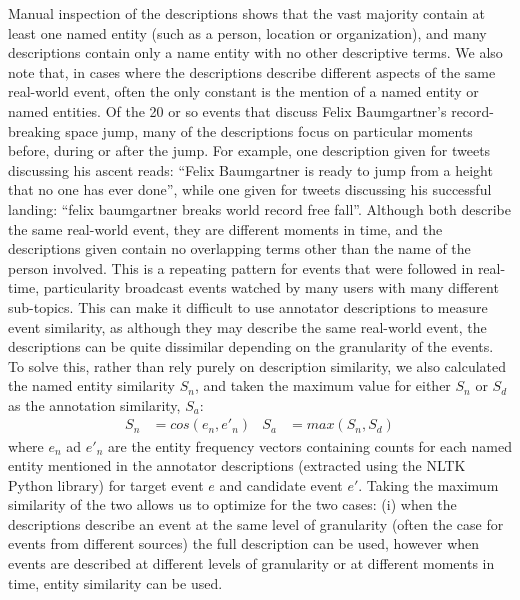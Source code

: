 Manual inspection of the descriptions shows that the vast majority contain at least one named entity (such as a person, location or organization), and many descriptions contain only a name entity with no other descriptive terms.
We also note that, in cases where the descriptions describe different aspects of the same real-world event, often the only constant is the mention of a named entity or named entities.
Of the 20 or so events that discuss Felix Baumgartner's record-breaking space jump, many of the descriptions  focus on particular moments before, during or after the jump. For example, one description given for tweets discussing his ascent reads: ``Felix Baumgartner is ready to jump from a height that no one has ever done'', while one given for tweets discussing his successful landing: ``felix baumgartner breaks world record free fall''.
Although both describe the same real-world event, they are different moments in time, and the descriptions given contain no overlapping terms other than the name of the person involved.
This is a repeating pattern for events that were followed in real-time, particularity broadcast events watched by many users with many different sub-topics.
This can make it difficult to use annotator descriptions to measure event similarity, as although they may describe the same real-world event, the descriptions can be quite dissimilar depending on the granularity of the events.
To solve this, rather than rely purely on description similarity, we also calculated the named entity similarity $S_n$, and taken the maximum value for either $S_n$ or $S_d$ as the annotation similarity, $S_a$:
\begin{align*}
	S_n &= cos(e_n, e'_n) & S_a &= max(S_n, S_d)
\end{align*}
where $e_n$ ad $e'_n$ are the entity frequency vectors containing counts for each named entity mentioned in the annotator descriptions (extracted using the NLTK Python library) for target event $e$ and candidate event $e'$.
Taking the maximum similarity of the two allows us to optimize for the two cases: (i) when the descriptions describe an event at the same level of granularity (often the case for events from different sources) the full description can be used, however when events are described at different levels of granularity or at different moments in time, entity similarity can be used.

